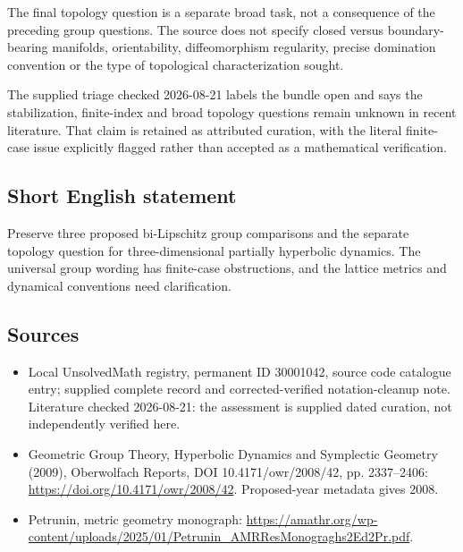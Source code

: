 \documentclass[11pt]{article}
\begin{document}
The final topology question is a separate broad task, not a consequence of the preceding group questions. The source does not specify closed versus boundary-bearing manifolds, orientability, diffeomorphism regularity, precise domination convention or the type of topological characterization sought.

The supplied triage checked 2026-08-21 labels the bundle open and says the stabilization, finite-index and broad topology questions remain unknown in recent literature. That claim is retained as attributed curation, with the literal finite-case issue explicitly flagged rather than accepted as a mathematical verification.
\subsection{Short English statement}
Preserve three proposed bi-Lipschitz group comparisons and the separate topology question for three-dimensional partially hyperbolic dynamics. The universal group wording has finite-case obstructions, and the lattice metrics and dynamical conventions need clarification.
\subsection{Sources}
\begin{itemize}
\item Local UnsolvedMath registry, permanent ID 30001042, source code catalogue entry; supplied complete record and corrected-verified notation-cleanup note. Literature checked 2026-08-21: the assessment is supplied dated curation, not independently verified here.
\item Geometric Group Theory, Hyperbolic Dynamics and Symplectic Geometry (2009), Oberwolfach Reports, DOI 10.4171/owr/2008/42, pp. 2337--2406: \url{https://doi.org/10.4171/owr/2008/42}. Proposed-year metadata gives 2008.
\item Petrunin, metric geometry monograph: \url{https://amathr.org/wp-content/uploads/2025/01/Petrunin_AMRResMonograghs2Ed2Pr.pdf}.
\end{itemize}
\end{document}
